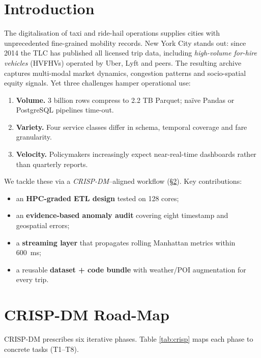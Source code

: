 \documentclass[conference]{IEEEtran}
\begin{document}
\section{Introduction}\label{sec:intro}
The digitalisation of taxi and ride-hail operations supplies cities
with unprecedented fine-grained mobility records.
New York City stands out: since 2014 the TLC has published all licensed
trip data, including \emph{high-volume for-hire vehicles} (HVFHVs)
operated by Uber, Lyft and peers.
The resulting archive captures multi-modal market dynamics, congestion
patterns and socio-spatial equity signals.
Yet three challenges hamper operational use:

\begin{enumerate}
  \item \textbf{Volume.} 3 billion rows compress to 2.2 TB Parquet; naïve
    Pandas or PostgreSQL pipelines time-out.
  \item \textbf{Variety.} Four service classes differ in schema,
    temporal coverage and fare granularity.
  \item \textbf{Velocity.} Policymakers increasingly expect
    near-real-time dashboards rather than quarterly reports.
\end{enumerate}

We tackle these via a \emph{CRISP-DM}–aligned workflow
(§\ref{sec:crisp}).
Key contributions:

\begin{itemize}
  \item an \textbf{HPC-graded ETL design} tested on 128 cores;
  \item an \textbf{evidence-based anomaly audit}
    covering eight timestamp and geospatial errors;
  \item a \textbf{streaming layer} that propagates rolling Manhattan
    metrics within \SI{600}{\milli\second};
  \item a reusable \textbf{dataset + code bundle} with weather/POI
    augmentation for every trip.
\end{itemize}

\section{CRISP-DM Road-Map}\label{sec:crisp}
CRISP-DM prescribes six iterative phases.
Table \ref{tab:crisp} maps each phase to concrete tasks (T1–T8).
\end{document}
